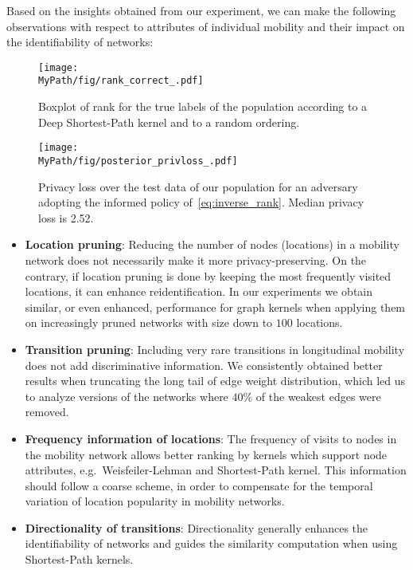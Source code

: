 Based on the insights obtained from our experiment, we can make the following observations with respect to attributes of individual mobility and their impact on the identifiability of networks:
%

\begin{figure*}[]
	\centering
	\begin{minipage}[b]{.45\textwidth}
		\texttt{[image: \\MyPath/fig/rank\_correct\_.pdf]}
		\caption{{Boxplot of rank for the true labels of the population according to a Deep Shortest-Path kernel and to a random ordering.}}
		\label{fig:rank_correct}
	\end{minipage}\qquad
	\begin{minipage}[b]{.45\textwidth}
		\texttt{[image: \\MyPath/fig/posterior\_privloss\_.pdf]}
		\centering \caption{{Privacy loss over the test data of our population for an adversary adopting the informed policy of~\eqref{eq:inverse_rank}. Median privacy loss is 2.52.}}
		\label{fig:privloss}
	\end{minipage}
\end{figure*}


\begin{itemize}
	\item \textbf{Location pruning}: Reducing the number of nodes (locations) in a mobility network does not necessarily make it more privacy-preserving.
	On the contrary, if location pruning is done by keeping the most frequently visited locations, it can enhance reidentification.
	In our experiments we obtain similar, or even enhanced, performance for graph kernels when applying them on increasingly pruned networks with size down to $100$ locations.

	\item \textbf{Transition pruning}: Including very rare transitions in longitudinal mobility does not add discriminative information.
	We consistently obtained better results when truncating the long tail of edge weight distribution, which led us to analyze versions of the networks where $40\%$ of the weakest edges were removed.
	\item \textbf{Frequency information of locations}: The frequency of visits to nodes in the mobility network allows better ranking by kernels which support node attributes, e.g.\ Weisfeiler-Lehman and Shortest-Path kernel.
	This information should follow a coarse scheme, in order to compensate for the temporal variation of location popularity in mobility networks.
	\item \textbf{Directionality of transitions}: Directionality generally enhances the identifiability of networks and guides the similarity computation when using Shortest-Path kernels.
\end{itemize}



